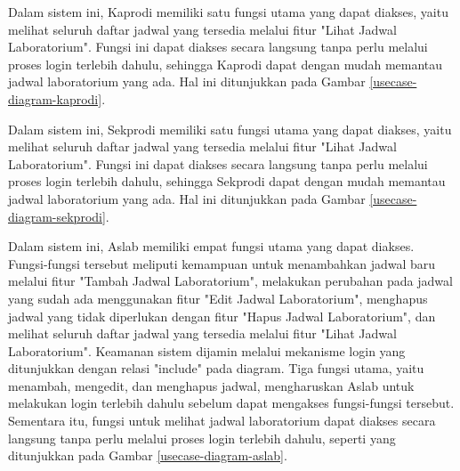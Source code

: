 Dalam sistem ini, Kaprodi memiliki satu fungsi utama yang dapat diakses, yaitu melihat seluruh daftar jadwal yang tersedia melalui fitur "Lihat Jadwal Laboratorium". Fungsi ini dapat diakses secara langsung tanpa perlu melalui proses login terlebih dahulu, sehingga Kaprodi dapat dengan mudah memantau jadwal laboratorium yang ada. Hal ini ditunjukkan pada Gambar \ref{usecase-diagram-kaprodi}.

Dalam sistem ini, Sekprodi memiliki satu fungsi utama yang dapat diakses, yaitu melihat seluruh daftar jadwal yang tersedia melalui fitur "Lihat Jadwal Laboratorium". Fungsi ini dapat diakses secara langsung tanpa perlu melalui proses login terlebih dahulu, sehingga Sekprodi dapat dengan mudah memantau jadwal laboratorium yang ada. Hal ini ditunjukkan pada Gambar \ref{usecase-diagram-sekprodi}.

Dalam sistem ini, Aslab memiliki empat fungsi utama yang dapat diakses. Fungsi-fungsi tersebut meliputi kemampuan untuk menambahkan jadwal baru melalui fitur "Tambah Jadwal Laboratorium", melakukan perubahan pada jadwal yang sudah ada menggunakan fitur "Edit Jadwal Laboratorium", menghapus jadwal yang tidak diperlukan dengan fitur "Hapus Jadwal Laboratorium", dan melihat seluruh daftar jadwal yang tersedia melalui fitur "Lihat Jadwal Laboratorium". Keamanan sistem dijamin melalui mekanisme login yang ditunjukkan dengan relasi "include" pada diagram. Tiga fungsi utama, yaitu menambah, mengedit, dan menghapus jadwal, mengharuskan Aslab untuk melakukan login terlebih dahulu sebelum dapat mengakses fungsi-fungsi tersebut. Sementara itu, fungsi untuk melihat jadwal laboratorium dapat diakses secara langsung tanpa perlu melalui proses login terlebih dahulu, seperti yang ditunjukkan pada Gambar \ref{usecase-diagram-aslab}.


